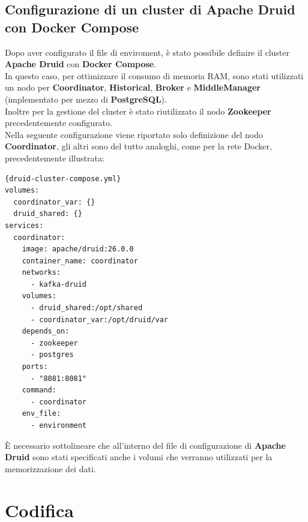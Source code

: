 \subsection{Configurazione di un cluster di Apache Druid con Docker Compose}
Dopo aver configurato il file di \gls{enviroment}{}, 
è stato possibile definire il \gls{cluster}{} \textbf{Apache Druid} con \textbf{Docker Compose}.\\
In questo caso, per ottimizzare il consumo di memoria RAM, sono stati utilizzati un nodo per \textbf{Coordinator}, \textbf{Historical}, \textbf{Broker} e \textbf{MiddleManager} (implementato per mezzo di \textbf{PostgreSQL}).\\
Inoltre per la gestione del \gls{cluster}{} è stato riutilizzato il nodo \textbf{Zookeeper} precedentemente configurato. \\
Nella seguente configurazione viene riportato solo definizione del nodo \textbf{Coordinator}, gli altri sono del tutto analoghi, come per la rete \gls{Docker}{}, precedentemente illustrata:
\pagebreak
\begin{lstlisting}[caption=\texttt{druid-cluster-compose.yml}, label=lst:file]{druid-cluster-compose.yml}
volumes:
  coordinator_var: {}
  druid_shared: {}
services:
  coordinator:
    image: apache/druid:26.0.0
    container_name: coordinator
    networks:
      - kafka-druid
    volumes:
      - druid_shared:/opt/shared
      - coordinator_var:/opt/druid/var
    depends_on:
      - zookeeper
      - postgres
    ports:
      - "8081:8081"
    command:
      - coordinator
    env_file:
      - environment
\end{lstlisting}
È necessario sottolineare che all'interno del file di configurazione di \textbf{Apache Druid} sono stati specificati anche i \gls{volumi}{} che verranno utilizzati per la memorizzazione dei dati.
\pagebreak
\section{Codifica}
